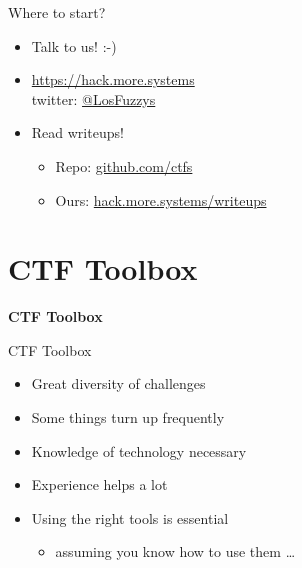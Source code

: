 \begin{frame}
	{Where to start?}

	\begin{itemize}
		\item Talk to us! :-)
		\item \url{https://hack.more.systems}
		  \\ twitter: \href{https://twitter.com/LosFuzzys}{@LosFuzzys}
	\end{itemize}

	\begin{itemize}
		\item Read writeups!
		\begin{itemize}
			\item Repo: \href{https://github.com/ctfs}{github.com/ctfs}
			\item Ours: \href{https://hack.more.systems/writeups}{hack.more.systems/writeups}
		\end{itemize}
	\end{itemize}

\end{frame}


\section{CTF Toolbox}

{
\begin{frame}[plain]

  \begin{center}
    {\Huge \hspace*{\fill} \textbf{CTF Toolbox}}

    \vspace{17em}
  \end{center}
\end{frame}
}

\begin{frame}
  {CTF Toolbox}

  \begin{itemize}
    \item Great diversity of challenges
    \item Some things turn up frequently
    \item Knowledge of technology necessary
    \item Experience helps a lot
  \end{itemize}

  \begin{itemize}
    \item Using the right tools is essential
      \begin{itemize}
        \item assuming you know how to use them \ldots
      \end{itemize}
  \end{itemize}

\end{frame}

